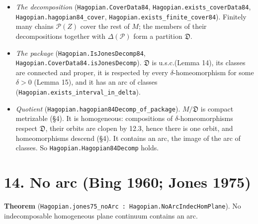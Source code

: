 \documentclass[11pt]{article}
\newcommand{\lean}[1]{\texttt{#1}}
\begin{document}
\begin{itemize}
  \item \emph{The decomposition} (\lean{Hagopian.\hspace{0pt}CoverData84}, \lean{Hagopian.\hspace{0pt}exists\_\hspace{0pt}coverData84}, \lean{Hagopian.\hspace{0pt}hagopian84\_\hspace{0pt}cover}, \lean{Hagopian.\hspace{0pt}exists\_\hspace{0pt}finite\_\hspace{0pt}cover84}). Finitely many chains $\mathcal{P} (Z)$ cover the rest of $M$; the members of their decompositions together with $\Delta (\mathcal{P})$ form a partition $\mathfrak{D}$.
  \item \emph{The package} (\lean{Hagopian.\hspace{0pt}IsJonesDecomp84}, \lean{Hagopian.\hspace{0pt}CoverData84.\hspace{0pt}isJonesDecomp}). $\mathfrak{D}$ is u.s.c.\@ (Lemma 14), its classes are connected and proper, it is respected by every $\delta$-homeomorphism for some $\delta > 0$ (Lemma 15), and it has an arc of classes (\lean{Hagopian.\hspace{0pt}exists\_\hspace{0pt}interval\_\hspace{0pt}in\_\hspace{0pt}delta}).
  \item \emph{Quotient} (\lean{Hagopian.\hspace{0pt}hagopian84Decomp\_\hspace{0pt}of\_\hspace{0pt}package}). $M/\mathfrak{D}$ is compact metrizable (\S{}4). It is homogeneous: compositions of $\delta$-homeomorphisms respect $\mathfrak{D}$, their orbits are clopen by 12.3, hence there is one orbit, and homeomorphisms descend (\S{}4). It contains an arc, the image of the arc of classes. So \lean{Hagopian.\hspace{0pt}Hagopian84Decomp} holds.
\end{itemize}

\section*{14. No arc (Bing 1960; Jones 1975)}

\textbf{Theorem} (\lean{Hagopian.\hspace{0pt}jones75\_\hspace{0pt}noArc : Hagopian.\hspace{0pt}NoArcIndecHomPlane}). No indecomposable homogeneous plane continuum contains an arc.
\end{document}
